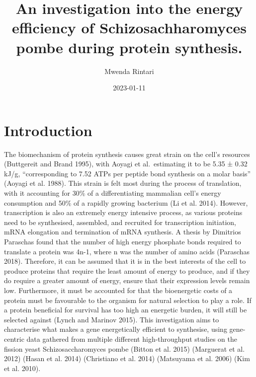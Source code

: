 \documentclass[
]{article}
\title{An investigation into the energy efficiency of Schizosachharomyces pombe during protein synthesis.}
\author{Mwenda Rintari}
\date{2023-01-11}
\begin{document}
\maketitle

{
\setcounter{tocdepth}{2}
\tableofcontents
}
\hypertarget{introduction}{%
\section{Introduction}\label{introduction}}

The biomechanism of protein synthesis causes great strain on the cell's resources (Buttgereit and Brand 1995), with Aoyagi et al.~estimating it to be 5.35 ± 0.32 kJ/g, ``corresponding to 7.52 ATPs per peptide bond synthesis on a molar basis'' (Aoyagi et al. 1988). This strain is felt most during the process of translation, with it accounting for 30\% of a differentiating mammalian cell's energy consumption and 50\% of a rapidly growing bacterium (Li et al. 2014). However, transcription is also an extremely energy intensive process, as various proteins need to be synthesised, assembled, and recruited for transcription initiation, mRNA elongation and termination of mRNA synthesis. A thesis by Dimitrios Paraschas found that the number of high energy phosphate bonds required to translate a protein was 4n-1, where n was the number of amino acids (Paraschas 2018). Therefore, it can be assumed that it is in the best interests of the cell to produce proteins that require the least amount of energy to produce, and if they do require a greater amount of energy, ensure that their expression levels remain low. Furthermore, it must be accounted for that the bioenergetic costs of a protein must be favourable to the organism for natural selection to play a role. If a protein beneficial for survival has too high an energetic burden, it will still be selected against (Lynch and Marinov 2015). This investigation aims to characterise what makes a gene energetically efficient to synthesise, using gene-centric data gathered from multiple different high-throughput studies on the fission yeast Schizosaccharomyces pombe (Bitton et al. 2015) (Marguerat et al. 2012) (Hasan et al. 2014) (Christiano et al. 2014) (Matsuyama et al. 2006) (Kim et al. 2010).
\end{document}
